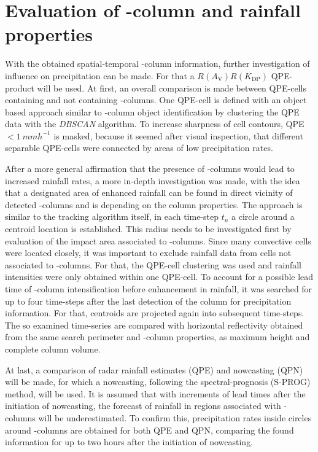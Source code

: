 \section{Evaluation of \zdr-column and rainfall properties}
\label{sec:zc-qpe}
With the obtained spatial-temporal \zdr-column information, further investigation of influence on precipitation can be made.
For that a $R(A_\text{V})R(K_\text{DP})$ QPE-product will be used.
At first, an overall comparison is made between QPE-cells containing and not containing \zdr-columns. One QPE-cell is defined with an object based approach similar to \zdr-column object identification by clustering the QPE data with the \emph{DBSCAN} algorithm. To increase sharpness of cell contours, QPE $< \SI{1}{mmh^{-1}}$ is masked, because it seemed after visual inspection, that different separable QPE-cells were connected by areas of low precipitation rates.

After a more general affirmation that the presence of \zdr-columns would lead to increased rainfall rates, a more in-depth investigation was made, with the idea that a designated area of enhanced rainfall can be found in direct vicinity of detected \zdr-columns and is depending on the column properties. 
The approach is similar to the tracking algorithm itself, in each time-step $t_{n}$ a circle around a centroid location is established. This radius needs to be investigated first by evaluation of the impact area associated to \zdr-columns. 
Since many convective cells were located closely, it was important to exclude rainfall data from cells not associated to \zdr-columns. For that, the QPE-cell clustering was used and rainfall intensities were only obtained within one QPE-cell.
To account for a possible lead time of \zdr-column intensification before enhancement in rainfall, it was searched for up to four time-steps after the last detection of the column for precipitation information. 
For that, centroids are projected again into subsequent time-steps.
The so examined time-series are compared with horizontal reflectivity obtained from the same search perimeter and \zdr-column properties, as maximum height and complete column volume.

At last, a comparison of radar rainfall estimates (QPE) and nowcasting (QPN) will be made, for which a nowcasting, following the spectral-prognosis (S-PROG) method, will be used.
It is assumed that with increments of lead times after the initiation of nowcasting, the forecast of rainfall in regions associated with \zdr-columns will be underestimated. To confirm this, precipitation rates inside circles around \zdr-columns are obtained for both QPE and QPN, comparing the found information for up to two hours after the initiation of nowcasting.













